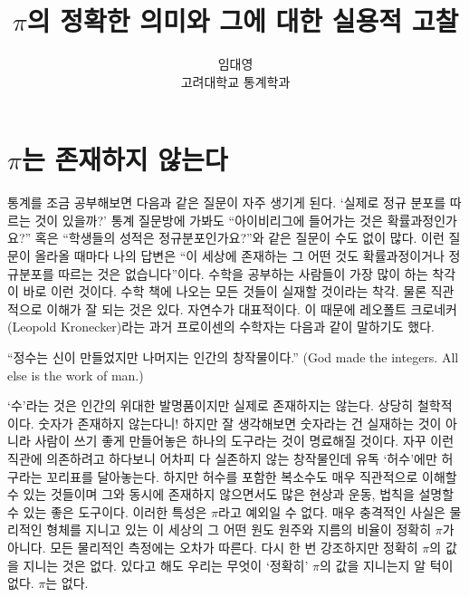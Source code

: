 \documentclass[10pt]{article}
\begin{document}
\nocite{*}

\title{$\pi$의 정확한 의미와 그에 대한 실용적 고찰}
\author{임대영 \\ 고려대학교 통계학과}
\maketitle

\section{$\pi$는 존재하지 않는다}
통계를 조금 공부해보면 다음과 같은 질문이 자주 생기게 된다. `실제로 정규 분포를 따르는 것이 있을까?' 통계 질문방에 가봐도 ``아이비리그에 들어가는 것은 확률과정인가요?'' 혹은 ``학생들의 성적은 정규분포인가요?''와 같은 질문이 수도 없이 많다. 이런 질문이 올라올 때마다 나의 답변은 ``이 세상에 존재하는 그 어떤 것도 확률과정이거나 정규분포를 따르는 것은 없습니다''이다. 수학을 공부하는 사람들이 가장 많이 하는 착각이 바로 이런 것이다. 수학 책에 나오는 모든 것들이 실재할 것이라는 착각. 물론 직관적으로 이해가 잘 되는 것은 있다. 자연수가 대표적이다. 이 때문에 레오폴트 크로네커(Leopold Kronecker)라는 과거 프로이센의 수학자는 다음과 같이 말하기도 했다.
\begin{center}
  ``정수는 신이 만들었지만 나머지는 인간의 창작물이다.'' (God made the integers. All else is the work of man.)
\end{center}
 `수'라는 것은 인간의 위대한 발명품이지만 실제로 존재하지는 않는다. 상당히 철학적이다. 숫자가 존재하지 않는다니! 하지만 잘 생각해보면 숫자라는 건 실재하는 것이 아니라 사람이 쓰기 좋게 만들어놓은 하나의 도구라는 것이 명료해질 것이다. 자꾸 이런 직관에 의존하려고 하다보니 어차피 다 실존하지 않는 창작물인데 유독 `허수'에만 허구라는 꼬리표를 달아놓는다. 하지만 허수를 포함한 복소수도 매우 직관적으로 이해할 수 있는 것들이며 그와 동시에 존재하지 않으면서도 많은 현상과 운동, 법칙을 설명할 수 있는 좋은 도구이다. 이러한 특성은 $\pi$라고 예외일 수 없다. 매우 충격적인 사실은 물리적인 형체를 지니고 있는 이 세상의 그 어떤 원도 원주와 지름의 비율이 정확히 $\pi$가 아니다. 모든 물리적인 측정에는 오차가 따른다. 다시 한 번 강조하지만 정확히 $\pi$의 값을 지니는 것은 없다. 있다고 해도 우리는 무엇이 `정확히' $\pi$의 값을 지니는지 알 턱이 없다. $\pi$는 없다.
\end{document}
